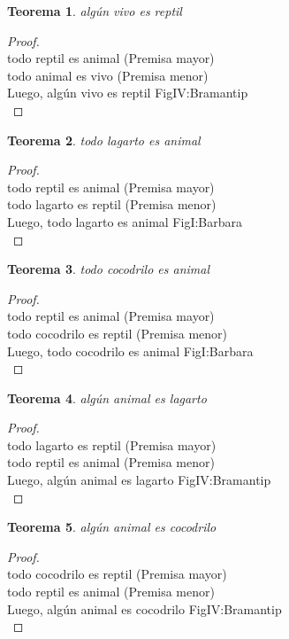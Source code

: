 ﻿\documentclass[12pt]{book}
\newtheorem{theorem}{Teorema}[chapter]
\newtheorem{proof}{Demostración}
\begin{document}
\begin{theorem}
algún vivo es reptil
\label{th: 34}
\end{theorem}\begin{proof}\\todo reptil es animal	 (Premisa mayor) \\todo animal es vivo	 (Premisa menor) \\Luego, algún vivo es reptil	FigIV:Bramantip \\ \end{proof}
\begin{theorem}
todo lagarto es animal
\label{th: 35}
\end{theorem}\begin{proof}\\todo reptil es animal	 (Premisa mayor) \\todo lagarto es reptil	 (Premisa menor) \\Luego, todo lagarto es animal	FigI:Barbara \\ \end{proof}
\begin{theorem}
todo cocodrilo es animal
\label{th: 36}
\end{theorem}\begin{proof}\\todo reptil es animal	 (Premisa mayor) \\todo cocodrilo es reptil	 (Premisa menor) \\Luego, todo cocodrilo es animal	FigI:Barbara \\ \end{proof}
\begin{theorem}
algún animal es lagarto
\label{th: 37}
\end{theorem}\begin{proof}\\todo lagarto es reptil	 (Premisa mayor) \\todo reptil es animal	 (Premisa menor) \\Luego, algún animal es lagarto	FigIV:Bramantip \\ \end{proof}
\begin{theorem}
algún animal es cocodrilo
\label{th: 38}
\end{theorem}\begin{proof}\\todo cocodrilo es reptil	 (Premisa mayor) \\todo reptil es animal	 (Premisa menor) \\Luego, algún animal es cocodrilo	FigIV:Bramantip \\ \end{proof}
\end{document}
